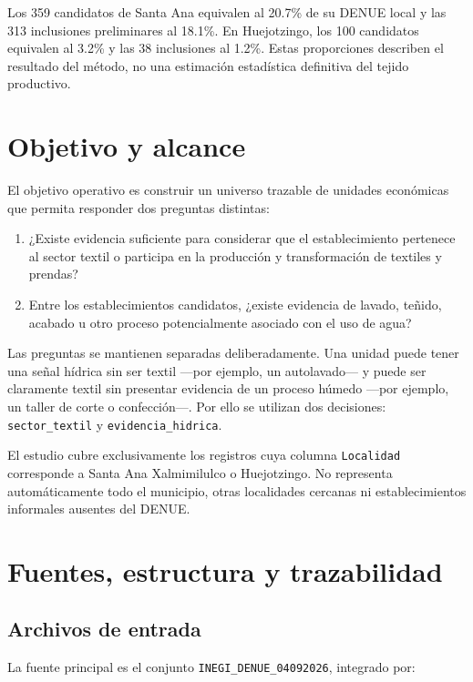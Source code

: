 \documentclass[11pt,letterpaper]{article}
\begin{document}
Los 359 candidatos de Santa Ana equivalen al 20.7\% de su DENUE local y las 313 inclusiones preliminares al 18.1\%. En Huejotzingo, los 100 candidatos equivalen al 3.2\% y las 38 inclusiones al 1.2\%. Estas proporciones describen el resultado del método, no una estimación estadística definitiva del tejido productivo.

\section{Objetivo y alcance}

El objetivo operativo es construir un universo trazable de unidades económicas que permita responder dos preguntas distintas:

\begin{enumerate}[label=\arabic*.]
  \item ¿Existe evidencia suficiente para considerar que el establecimiento pertenece al sector textil o participa en la producción y transformación de textiles y prendas?
  \item Entre los establecimientos candidatos, ¿existe evidencia de lavado, teñido, acabado u otro proceso potencialmente asociado con el uso de agua?
\end{enumerate}

Las preguntas se mantienen separadas deliberadamente. Una unidad puede tener una señal hídrica sin ser textil ---por ejemplo, un autolavado--- y puede ser claramente textil sin presentar evidencia de un proceso húmedo ---por ejemplo, un taller de corte o confección---. Por ello se utilizan dos decisiones: \texttt{sector\_textil} y \texttt{evidencia\_hidrica}.

El estudio cubre exclusivamente los registros cuya columna \texttt{Localidad} corresponde a Santa Ana Xalmimilulco o Huejotzingo. No representa automáticamente todo el municipio, otras localidades cercanas ni establecimientos informales ausentes del DENUE.

\section{Fuentes, estructura y trazabilidad}

\subsection{Archivos de entrada}

La fuente principal es el conjunto \texttt{INEGI\_DENUE\_04092026}, integrado por:
\end{document}

